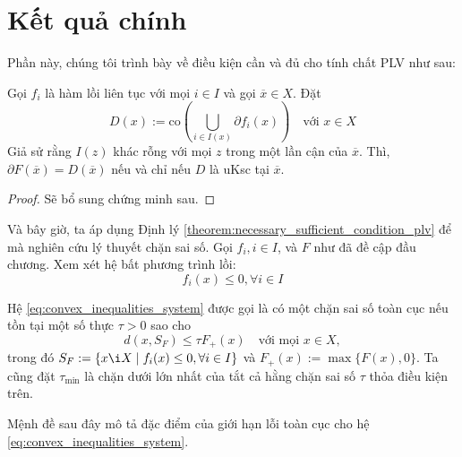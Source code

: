 \section{Kết quả chính}

Phần này, chúng tôi trình bày về điều kiện cần và đủ cho tính chất PLV như sau:

\begin{theorem}
    \label{theorem:necessary_sufficient_condition_plv}
    Gọi $f_i$ là hàm lồi liên tục với mọi $i \in I$ và gọi $\overline{x} \in X$. Đặt
    \begin{equation}
        D(x) := \text{co}\left(\bigcup_{i \in I(x)}\partial f_i(x) \right)\quad\text{với } x \in X
    \end{equation}
    Giả sử rằng $I(z)$ khác rỗng với mọi $z$ trong một lần cận của $\overline{x}$. Thì, $\partial F(\overline{x}) = D(\overline{x})$ nếu và chỉ nếu $D$ là uKsc tại $\overline{x}$.
\end{theorem}
\begin{proof}
    Sẽ bổ sung chứng minh sau.
\end{proof}

Và bây giờ, ta áp dụng Định lý \ref{theorem:necessary_sufficient_condition_plv} để mà nghiên cứu lý thuyết chặn sai số. Gọi $f_i, i \in I$, và $F$ như đã đề cập đầu chương. Xem xét hệ bất phương trình lồi:
\begin{equation}
    \label{eq:convex_inequalities_system}
    f_i(x) \leq 0, \forall i \in I
\end{equation}

\begin{defi}
    Hệ \eqref{eq:convex_inequalities_system} được gọi là có một chặn sai số toàn cục nếu tồn tại một số thực $\tau > 0$ sao cho
    \begin{equation}
        d(x, S_F) \leq \tau F_{+}(x)\quad\text{với mọi } x \in X,
    \end{equation}
    trong đó $S_F := \{ x \i X \mid f_i(x) \leq 0, \forall i \in I\}$ và $F_{+}(x) := \max\{F(x), 0\}$. Ta cũng đặt $\tau_{\min}$ là chặn dưới lớn nhất của tắt cả hằng chặn sai số $\tau$ thỏa điều kiện trên.
\end{defi}

Mệnh đề sau đây mô tả đặc điểm của giới hạn lỗi toàn cục cho hệ \eqref{eq:convex_inequalities_system}.

